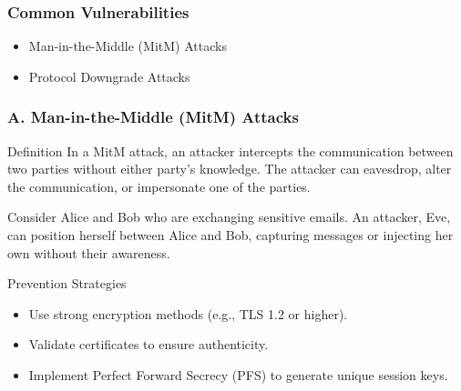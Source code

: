\documentclass{beamer}
\begin{document}
\begin{frame}[fragile]
    \frametitle{Common Vulnerabilities}
    \begin{itemize}
        \item Man-in-the-Middle (MitM) Attacks
        \item Protocol Downgrade Attacks
    \end{itemize}
\end{frame}

\begin{frame}[fragile]
    \frametitle{A. Man-in-the-Middle (MitM) Attacks}
    \begin{block}{Definition}
        In a MitM attack, an attacker intercepts the communication between two parties without either party's knowledge. The attacker can eavesdrop, alter the communication, or impersonate one of the parties.
    \end{block}
    
    \begin{example}
        Consider Alice and Bob who are exchanging sensitive emails. An attacker, Eve, can position herself between Alice and Bob, capturing messages or injecting her own without their awareness.
    \end{example}
    
    \begin{block}{Prevention Strategies}
        \begin{itemize}
            \item Use strong encryption methods (e.g., TLS 1.2 or higher).
            \item Validate certificates to ensure authenticity.
            \item Implement Perfect Forward Secrecy (PFS) to generate unique session keys.
        \end{itemize}
    \end{block}
\end{frame}
\end{document}
